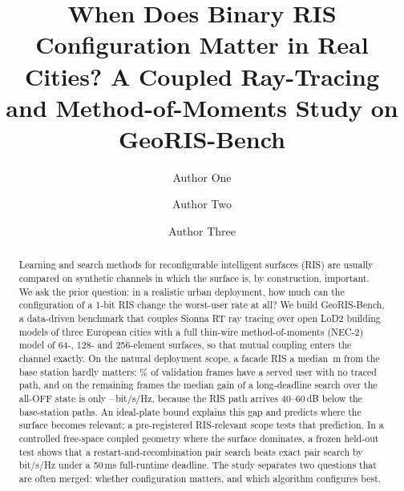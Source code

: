\documentclass[runningheads]{llncs}
\begin{document}
\title{When Does Binary RIS Configuration Matter in Real Cities? A Coupled Ray-Tracing and Method-of-Moments Study on GeoRIS-Bench}
\author{Author One \and
Author Two \and
Author Three}
\maketitle

\begin{abstract}
Learning and search methods for reconfigurable intelligent surfaces (RIS) are usually compared on synthetic channels in which the surface is, by construction, important. We ask the prior question: in a realistic urban deployment, how much can the configuration of a 1-bit RIS change the worst-user rate at all? We build GeoRIS-Bench, a data-driven benchmark that couples Sionna RT ray tracing over open LoD2 building models of three European cities with a full thin-wire method-of-moments (NEC-2) model of 64-, 128- and 256-element surfaces, so that mutual coupling enters the channel exactly. On the natural deployment scope, a facade RIS a median \,m from the base station hardly matters: \% of validation frames have a served user with no traced path, and on the remaining frames the median gain of a long-deadline search over the all-OFF state is only --\,bit/s/Hz, because the RIS path arrives 40--60\,dB below the base-station paths. An ideal-plate bound explains this gap and predicts where the surface becomes relevant; a pre-registered RIS-relevant scope tests that prediction. In a controlled free-space coupled geometry where the surface dominates, a frozen held-out test shows that a restart-and-recombination pair search beats exact pair search by \,bit/s/Hz under a 50\,ms full-runtime deadline. The study separates two questions that are often merged: whether configuration matters, and which algorithm configures best.
\end{abstract}
\end{document}
